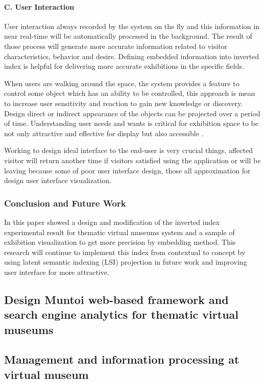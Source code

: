 \paragraph{C. User Interaction}
User interaction always recorded by the system on the fly and this information in near real-time will be automatically processed in the background. The result of those process will generate more accurate information related to visitor characteristics, behavior and desire. Defining embedded information into inverted index is helpful for delivering more accurate exhibitions in the specific fields.

When users are walking around the space, the system provides a feature to control some object which has an ability to be controlled, this approach is mean to increase user sensitivity and reaction to gain new knowledge or discovery. Design direct or indirect appearance of the objects can be projected over a period of time. Understanding user needs and wants is critical for exhibition space to be not only attractive and effective for display but also accessible \cite{LordPiacente}.

Working to design ideal interface to the end-user is very crucial things, affected visitor will return another time if visitors satisfied using the application or will be leaving because some of poor user interface design, those all approximation for design user interface visualization.

\subsubsection{Conclusion and Future Work}
In this paper showed a design and modification of the inverted index experimental result for thematic virtual museums system and a sample of exhibition visualization to get more precision by embedding method. This research will continue to implement this index from contextual to concept by using latent semantic indexing (LSI) projection in future work and improving user interface for more attractive.

\subsection{Design Muntoi web-based framework and search engine analytics for thematic virtual museums}\label{subsec:ch4/sec2/sub3}

\subsection{Management and information processing at virtual museum}\label{subsec:ch4/sec2/sub4}


